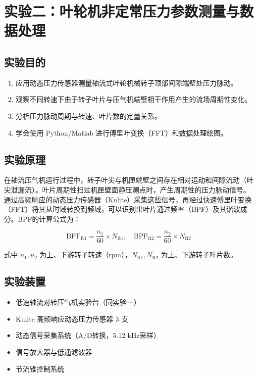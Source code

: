 
\section{实验二：叶轮机非定常压力参数测量与数据处理}

\subsection{实验目的}

\begin{enumerate}
    \item 应用动态压力传感器测量轴流式叶轮机械转子顶部间隙端壁处压力脉动。
    \item 观察不同转速下由于转子叶片与压气机端壁相干作用产生的流场周期性变化。
    \item 分析压力脉动周期与转速、叶片数的定量关系。
    \item 学会使用 Python/Matlab 进行傅里叶变换（FFT）和数据处理绘图。
\end{enumerate}

\subsection{实验原理}

在轴流压气机运行过程中，转子叶尖与机匣端壁之间存在相对运动和间隙流动（叶尖泄漏流）。叶片周期性扫过机匣壁面静压测点时，产生周期性的压力脉动信号。通过高频响应的动态压力传感器（Kulite）采集这些信号，再经过快速傅里叶变换（FFT）将其从时域转换到频域，可以识别出叶片通过频率（BPF）及其谐波成分。BPF的计算公式为：

\begin{equation}
    \text{BPF}_{\text{R1}} = \frac{n_1}{60} \times N_{\text{R1}}, \quad
    \text{BPF}_{\text{R2}} = \frac{n_2}{60} \times N_{\text{R2}}
\end{equation}

式中 $n_1, n_2$ 为上、下游转子转速（rpm），$N_{\text{R1}}, N_{\text{R2}}$ 为上、下游转子叶片数。

\subsection{实验装置}

\begin{itemize}
    \item 低速轴流对转压气机实验台（同实验一）
    \item Kulite 高频响应动态压力传感器 3 支
    \item 动态信号采集系统（A/D转换，5.12 kHz采样）
    \item 信号放大器与低通滤波器
    \item 节流锥控制系统
\end{itemize}

